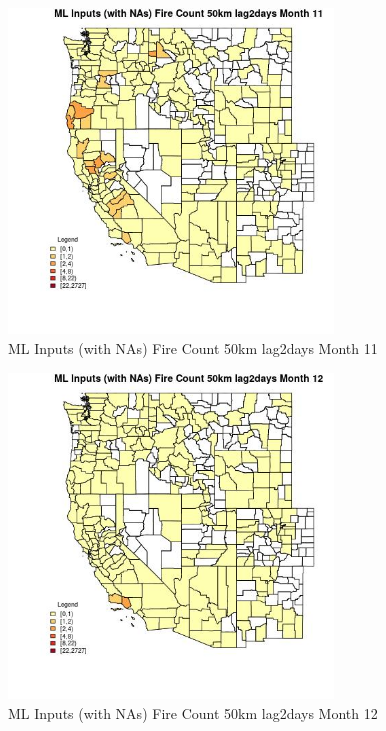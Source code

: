 \begin{figure} 
\centering  
\includegraphics[width=0.77\textwidth]{Code_Outputs/Report_ML_input_PM25_Step4_part_f_de_duplicated_aves_prioritize_24hr_obswNAs_CountyFire_Count_50km_lag2daysmedianMonth11.jpg} 
\caption{\label{fig:Report_ML_input_PM25_Step4_part_f_de_duplicated_aves_prioritize_24hr_obswNAsCountyFire_Count_50km_lag2daysmedianMonth11}ML Inputs (with NAs) Fire Count 50km lag2days Month 11} 
\end{figure} 
 

\begin{figure} 
\centering  
\includegraphics[width=0.77\textwidth]{Code_Outputs/Report_ML_input_PM25_Step4_part_f_de_duplicated_aves_prioritize_24hr_obswNAs_CountyFire_Count_50km_lag2daysmedianMonth12.jpg} 
\caption{\label{fig:Report_ML_input_PM25_Step4_part_f_de_duplicated_aves_prioritize_24hr_obswNAsCountyFire_Count_50km_lag2daysmedianMonth12}ML Inputs (with NAs) Fire Count 50km lag2days Month 12} 
\end{figure} 
 

